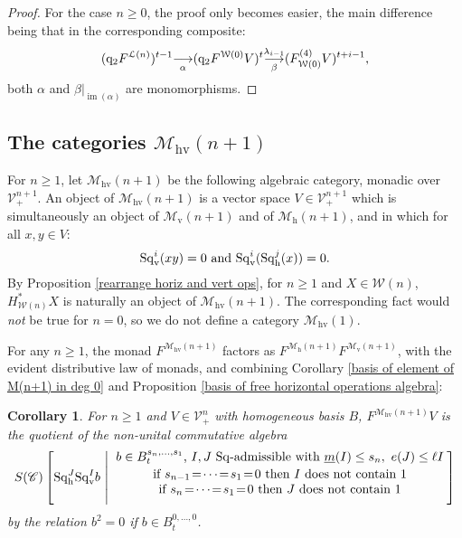 \documentclass[11pt]{amsart} \renewcommand{\baselinestretch}{1.2}
\theoremstyle{plain}
\newtheorem{cor}[thm]{Corollary}
\theoremstyle{definition}
\DeclareMathOperator{\im}{im}
\renewcommand{\to}{\longrightarrow}
\newcommand{\scrC}{\mathscr{C}}
\newcommand{\calV}{\mathcal{V}}
\newcommand{\calw}{\mathcal{W}}
\newcommand{\call}{\mathcal{L}}
\newcommand{\calMv}{\mathcal{M}\dver}
\newcommand{\calMh}{\mathcal{M}\dhor}
\newcommand{\calMhv}{\mathcal{M}_\mathrm{hv}}
\newcommand{\CommOperad}{{\scrC}}
\newcommand{\vect}[2]{\calV^{#1}_{#2}}
\newcommand{\quadgrad}[1]{\mathrm{q}_{#1}}
\newcommand{\mono}{{\to}}
\newcommand{\minDimSq}{\underline{m}}
\newcommand{\excess}{e}
\newcommand{\Sq}{\mathrm{Sq}}
\newcommand{\uver}{^\mathrm{v}}
\newcommand{\dver}{_\mathrm{v}}
\newcommand{\dhor}{_\mathrm{h}}
\newcommand{\Sqh}{\mathrm{Sq}\dhor}
\newcommand{\Sqv}{\mathrm{Sq}\dver}
\newcommand{\deltav}{\delta\uver}
\begin{document}
\begin{Cohomology Operations for W and U}
\begin{proof}
For the case $n\geq0$, the proof only becomes easier, the main difference being that in the corresponding composite:
\[(\quadgrad{2}F^{\call(n)})^{t-1}\underset{\smash{\alpha}}{{\to}} (\quadgrad{2}F^{\calw(0)}V)^{t}\underset{\smash{\beta}}{\overset{\lambda_{i-1}}{\mono}} (F^{(4)}_{\calw(0)}V)^{t+i-1},\]
both $\alpha$ and $\beta|_{\im(\alpha)}$ are monomorphisms.
\end{proof}

\subsection{The categories $\calMhv(n+1)$}
For $n\geq1$, let $\calMhv(n+1)$ be the following algebraic category, monadic over $\vect{n+1}{+}$. An object of $\calMhv(n+1)$ is a vector space $V\in \vect{n+1}{+}$ which is simultaneously an object of $\calMv(n+1)$ and of $\calMh(n+1)$, and in which for all $x,y\in V$:
\[\Sqv^i(xy)=0\textup{ and }\Sqv^i(\Sqh^j(x))=0.\]
By Proposition \ref{rearrange horiz and vert ops}, for $n\geq1$ and $X\in\calw(n)$, $H^*_{\calw(n)}X$ is naturally an object of $\calMhv(n+1)$. The corresponding fact would \emph{not} be true for $n=0$, so we do not define a category $\calMhv(1)$.

For any $n\geq1$, the monad $F^{\calMhv(n+1)}$ factors as $F^{\calMh(n+1)}F^{\calMv(n+1)}$, with the evident distributive law of monads, and combining Corollary \ref{basis of element of M(n+1) in deg 0} and Proposition \ref{basis of free horizontal operations algebra}:
\begin{cor}
\label{calMhv(n+1) description}
For $n\geq1$ and $V\in\vect{n}{+}$ with homogeneous basis $B$,  $F^{\calMhv(n+1)}V$ is the quotient of the non-unital commutative algebra
%
%
%
\[S(\CommOperad) \left[\Sq\dhor^J\Sq\dver^Ib\ \middle|\ \genfrac{}{}{0pt}{}{{\displaystyle\genfrac{}{}{0pt}{}{b\in B^{s_{n},\ldots,s_1}_t\textup{, $I,J$ $\Sq$-admissible with }\minDimSq(I)\leq s_n,\ \excess(J)\leq \ell I}{\textup{if }s_{n-1}\!=\!\cdots\!=\!s_1\!=\!0\textup{ then $I$ does not contain 1}}}}{
\textup{if }s_{n}\!=\!\cdots\!=\!s_1\!=\!0\textup{ then $J$ does not contain 1}
}
\right]\]
by the relation $b^2=0$ if $b\in B_t^{0,\ldots,0}$.
\end{cor}



\end{Cohomology Operations for W and U}
\end{document}
